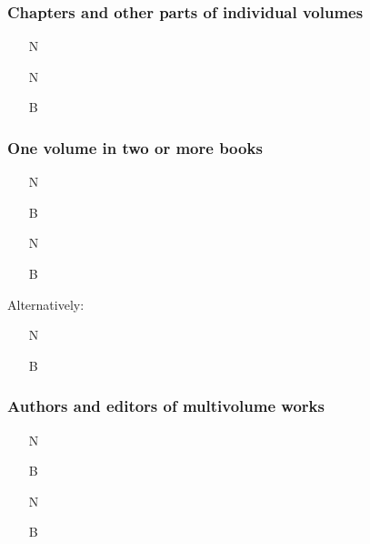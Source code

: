 \documentclass[11pt,letterpaper,oneside]{article}
\begin{document}
\subsubsection{Chapters and other parts of individual volumes}
\label{14.125}

\begin{itemize}
\item[N] 

\item[N] 

\item[B] 
\end{itemize}

\subsubsection{One volume in two or more books}
\label{14.126}


\begin{itemize}
\item[N] 

\item[B] 

\item[N] 

\item[B] 
\end{itemize}

\noindent Alternatively:

\begin{itemize}
\item[N] 

\item[B] 
\end{itemize}

\subsubsection{Authors and editors of multivolume works}
\label{14.127}

\begin{itemize}
\item[N] 

\item[B] 

\item[N] 

\item[B] 
\end{itemize}
\end{document}
